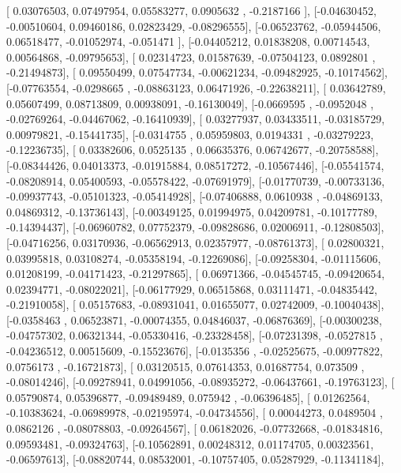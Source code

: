 \documentclass{article}
\begin{document}
       [ 0.03076503,  0.07497954,  0.05583277,  0.0905632 , -0.2187166 ],
       [-0.04630452, -0.00510604,  0.09460186,  0.02823429, -0.08296555],
       [-0.06523762, -0.05944506,  0.06518477, -0.01052974, -0.051471  ],
       [-0.04405212,  0.01838208,  0.00714543,  0.00564868, -0.09795653],
       [ 0.02314723,  0.01587639, -0.07504123,  0.0892801 , -0.21494873],
       [ 0.09550499,  0.07547734, -0.00621234, -0.09482925, -0.10174562],
       [-0.07763554, -0.0298665 , -0.08863123,  0.06471926, -0.22638211],
       [ 0.03642789,  0.05607499,  0.08713809,  0.00938091, -0.16130049],
       [-0.0669595 , -0.0952048 , -0.02769264, -0.04467062, -0.16410939],
       [ 0.03277937,  0.03433511, -0.03185729,  0.00979821, -0.15441735],
       [-0.0314755 ,  0.05959803,  0.0194331 , -0.03279223, -0.12236735],
       [ 0.03382606,  0.0525135 ,  0.06635376,  0.06742677, -0.20758588],
       [-0.08344426,  0.04013373, -0.01915884,  0.08517272, -0.10567446],
       [-0.05541574, -0.08208914,  0.05400593, -0.05578422, -0.07691979],
       [-0.01770739, -0.00733136, -0.09937743, -0.05101323, -0.05414928],
       [-0.07406888,  0.0610938 , -0.04869133,  0.04869312, -0.13736143],
       [-0.00349125,  0.01994975,  0.04209781, -0.10177789, -0.14394437],
       [-0.06960782,  0.07752379, -0.09828686,  0.02006911, -0.12808503],
       [-0.04716256,  0.03170936, -0.06562913,  0.02357977, -0.08761373],
       [ 0.02800321,  0.03995818,  0.03108274, -0.05358194, -0.12269086],
       [-0.09258304, -0.01115606,  0.01208199, -0.04171423, -0.21297865],
       [ 0.06971366, -0.04545745, -0.09420654,  0.02394771, -0.08022021],
       [-0.06177929,  0.06515868,  0.03111471, -0.04835442, -0.21910058],
       [ 0.05157683, -0.08931041,  0.01655077,  0.02742009, -0.10040438],
       [-0.0358463 ,  0.06523871, -0.00074355,  0.04846037, -0.06876369],
       [-0.00300238, -0.04757302,  0.06321344, -0.05330416, -0.23328458],
       [-0.07231398, -0.0527815 , -0.04236512,  0.00515609, -0.15523676],
       [-0.0135356 , -0.02525675, -0.00977822,  0.0756173 , -0.16721873],
       [ 0.03120515,  0.07614353,  0.01687754,  0.073509  , -0.08014246],
       [-0.09278941,  0.04991056, -0.08935272, -0.06437661, -0.19763123],
       [ 0.05790874,  0.05396877, -0.09489489,  0.075942  , -0.06396485],
       [ 0.01262564, -0.10383624, -0.06989978, -0.02195974, -0.04734556],
       [ 0.00044273,  0.0489504 ,  0.0862126 , -0.08078803, -0.09264567],
       [ 0.06182026, -0.07732668, -0.01834816,  0.09593481, -0.09324763],
       [-0.10562891,  0.00248312,  0.01174705,  0.00323561, -0.06597613],
       [-0.08820744,  0.08532001, -0.10757405,  0.05287929, -0.11341184],
\end{document}

